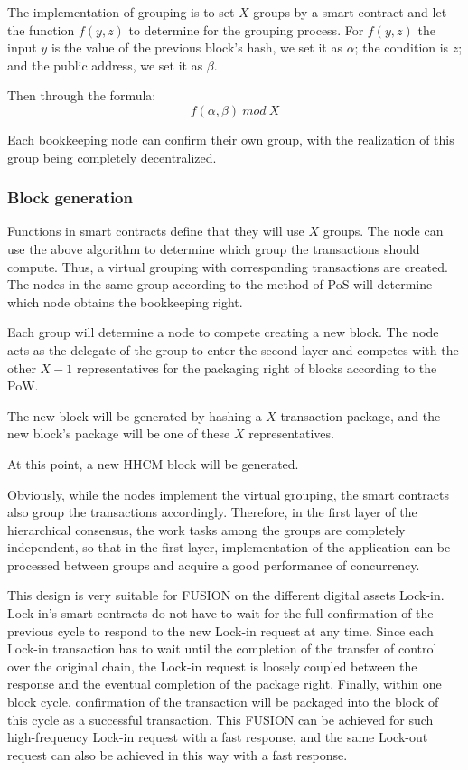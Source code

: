 \documentclass[a4paper,12pt]{article}
\begin{document}
The implementation of grouping is to set $X$ groups by a smart contract and let the function $f(y, z)$ to determine for the grouping process. For $f(y, z)$ the input $y$ is the value of the previous block's hash, we set it as $\alpha$; the condition is $z$; and the public address, we set it as $\beta$.

Then through the formula: $$f(\alpha, \beta)\ mod \ X$$

Each bookkeeping node can confirm their own group, with the realization of this group being completely decentralized.

\subsubsection {Block generation}

Functions in smart contracts define that they will use $X$ groups. The node can use the above algorithm to determine which group the transactions should compute. Thus, a virtual grouping with corresponding transactions are created. The nodes in the same group according to the method of PoS will determine which node obtains the bookkeeping right.

Each group will determine a node to compete creating a new block. The node acts as the delegate of the group to enter the second layer and competes with the other $X-1$ representatives for the packaging right of blocks according to the PoW.

The new block will be generated by hashing a $X$ transaction package, and the new block's package will be one of these $X$ representatives.

At this point, a new HHCM block will be generated.

Obviously, while the nodes implement the virtual grouping, the smart contracts also group the transactions accordingly. Therefore, in the first layer of the hierarchical consensus, the work tasks among the groups are completely independent, so that in the first layer, implementation of the application can be processed between groups and acquire a good performance of concurrency.

This design is very suitable for FUSION on the different digital assets Lock-in. Lock-in's smart contracts do not have to wait for the full confirmation of the previous cycle to respond to the new Lock-in request at any time. Since each Lock-in transaction has to wait until the completion of the transfer of control over the original chain, the Lock-in request is loosely coupled between the response and the eventual completion of the package right. Finally, within one block cycle, confirmation of the transaction will be packaged into the block of this cycle as a successful transaction. This FUSION can be achieved for such high-frequency Lock-in request with a fast response, and the same Lock-out request can also be achieved in this way with a fast response.
\end{document}
